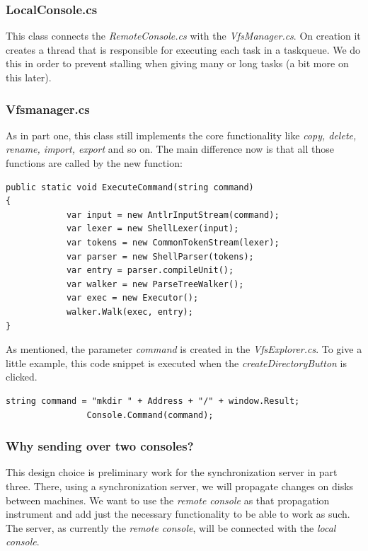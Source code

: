 \documentclass[a4paper,12pt]{article}
\begin{document}
\subsubsection{LocalConsole.cs}
This class connects the \emph{RemoteConsole.cs} with the \emph{VfsManager.cs}. On creation it creates a thread that is responsible for executing each task in a taskqueue. We do this in order to prevent stalling when giving many or long tasks (a bit more on this later).
\subsubsection{Vfsmanager.cs}
As in part one, this class still implements the core functionality like \emph{copy, delete, rename, import, export } and so on. The main difference now is that all those functions are called by the new function: \\
\begin{lstlisting}[label={lst:1},caption=Command Execution]
public static void ExecuteCommand(string command)
{
            var input = new AntlrInputStream(command);
            var lexer = new ShellLexer(input);
            var tokens = new CommonTokenStream(lexer);
            var parser = new ShellParser(tokens);
            var entry = parser.compileUnit();
            var walker = new ParseTreeWalker();
            var exec = new Executor();
            walker.Walk(exec, entry);
}
\end{lstlisting}
As mentioned, the parameter \emph{command} is created in the \emph{VfsExplorer.cs}. To give a little example, this code snippet is executed when the \emph{createDirectoryButton} is clicked.
\begin{lstlisting}[label={lst:2},caption=Command Creation]
                string command = "mkdir " + Address + "/" + window.Result;
                Console.Command(command);
\end{lstlisting}

\subsubsection{Why sending over two consoles?}
This design choice is preliminary work for the synchronization server in part three. There, using a synchronization server, we will propagate changes on disks between machines. We want to use the \emph{remote console} as that propagation instrument and add just the necessary functionality to be able to work as such. The server, as currently the \emph{remote console}, will be connected with the \emph{local console}.
\end{document}

